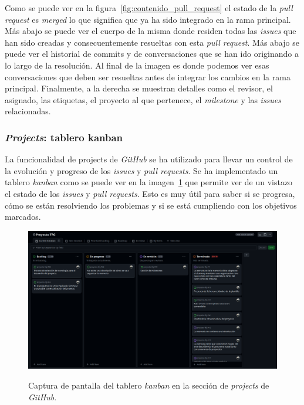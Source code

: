 Como se puede ver en la figura~\ref{fig:contenido_pull_request} el estado de la \textit{pull request} es \textit{merged} lo que significa que ya ha sido integrado en la rama principal. Más abajo se puede ver el cuerpo de la misma donde residen todas las \textit{issues} que han sido creadas y consecuentemente resueltas con esta \textit{pull request}. Más abajo se puede ver el historial de commits y de conversaciones que se han ido originando a lo largo de la resolución. Al final de la imagen es donde podemos ver esas conversaciones que deben ser resueltas antes de integrar los cambios en la rama principal. Finalmente, a la derecha se muestran detalles como el revisor, el asignado, las etiquetas, el proyecto al que pertenece, el \textit{milestone} y las \textit{issues} relacionadas.

\subsubsection{\textit{Projects}: tablero kanban}

La funcionalidad de projects de \textit{GitHub} se ha utilizado para llevar un control de la evolución y progreso de los \textit{issues} y \textit{pull requests}. Se ha implementado un tablero \textit{kanban} como se puede ver en la imagen~\ref{fig:tablero_kanban} que permite ver de un vistazo el estado de los \textit{issues} y \textit{pull requests}. Esto es muy útil para saber si se progresa, cómo se están resolviendo los problemas y si se está cumpliendo con los objetivos marcados.

\begin{figure}[H]
    \caption{Captura de pantalla del tablero \textit{kanban} en la sección de \textit{projects} de \textit{GitHub}.}
    \centering
    \vspace*{0.5cm}
    \includegraphics[scale=0.2]{figuras/projects_github.png}\label{fig:tablero_kanban}
\end{figure}

